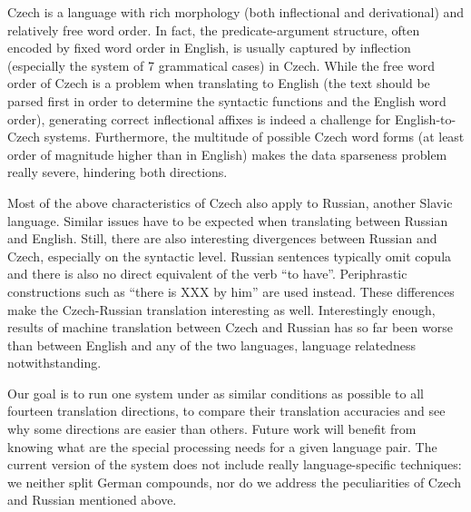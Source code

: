 \documentclass[11pt,letterpaper]{article}
\begin{document}
Czech is a language with rich morphology (both inflectional and derivational) and relatively free word order.
In fact, the predicate-argument structure, often encoded by fixed word order in English, is usually captured by inflection (especially the system of 7 grammatical cases) in Czech.
While the free word order of Czech is a problem when translating to English
(the text should be parsed first in order to determine the syntactic functions
and the English word order),
generating correct inflectional affixes is indeed a challenge for English-to-Czech systems.
Furthermore, the multitude of possible Czech word forms (at least order of magnitude higher than in English) makes the data sparseness problem really severe, hindering both directions.

Most of the above characteristics of Czech also apply to Russian, another Slavic language.
Similar issues have to be expected when translating between Russian and English.
Still, there are also interesting divergences between Russian and Czech, especially
on the syntactic level. Russian sentences typically omit copula and there is also no
direct equivalent of the verb ``to have''. Periphrastic constructions such as
``there is XXX by him'' are used instead. These differences make the Czech-Russian
translation interesting as well. Interestingly enough, results of machine translation between Czech and Russian has so far been worse than between English and any of the two languages, language relatedness notwithstanding.

\begin{comment}
There are numerous ways how these issues could be addressed.
For instance, parsing and syntax-aware reordering of the source-language sentences can help with the word order differences (same goal could be achieved by a reordering model or a synchronous context-free grammar in a hierarchical system).
Factored translation, a secondary language model of morphological tags or even a morphological generator are some of the possible solutions to the poor-to-rich translation issues.
\end{comment}

Our goal is to run one system under as similar conditions as possible to all fourteen translation directions,
to compare their translation accuracies and see why some directions are easier than others.
Future work will benefit from knowing what are the special processing needs for a given language pair.
The current version of the system does not include really language-specific techniques:
we neither split German compounds, nor do we address the peculiarities of Czech and Russian
mentioned above.
\end{document}
